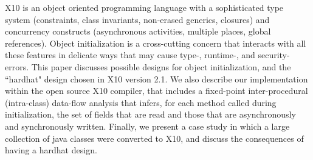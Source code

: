X10 is an object oriented programming language with a sophisticated
    type system (constraints, class invariants, non-erased generics, closures)
    and concurrency constructs (asynchronous activities, multiple places, global references).
Object initialization is a cross-cutting concern that interacts with all these features
    in delicate ways that may cause type-, runtime-, and security- errors.
This paper discusses possible designs for object initialization,
    and the ``hardhat" design chosen in X10 version 2.1.
We also describe our implementation within the open source X10 compiler,
    that includes a
    fixed-point inter-procedural (intra-class)
    data-flow analysis
    that infers, for each method called during initialization,
    the set of fields that are read and
    those that are asynchronously and synchronously written.
Finally, we present a case study in which a large collection of java classes
    were converted to X10,
    and discuss the consequences of having a hardhat design.
